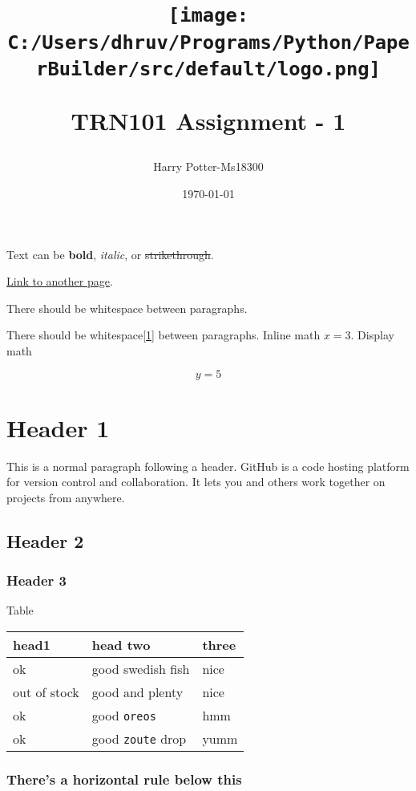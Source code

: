 \documentclass[
  12pt,
]{article}
\title{
  \begin{center}
    \texttt{[image: C:/Users/dhruv/Programs/Python/PaperBuilder/src/default/logo.png]}\\[0.5cm]
  \end{center}
  TRN101 Assignment  - 1 }
\author{Harry Potter-Ms18300
  \date{\today}
}
\begin{document}
\maketitle


      {
        \hypersetup{linkcolor=}
        \setcounter{tocdepth}{3}
    \tableofcontents
  }
    \pagebreak
Text can be \textbf{bold}, \emph{italic}, or \sout{strikethrough}.

\href{https://another-page.html}{Link to another page}.

There should be whitespace between paragraphs.

There should be whitespace\protect\hyperlink{ref-testcite}{{[}1{]}}
between paragraphs. Inline math \(x=3\). Display math

\[y=5\]

\hypertarget{header-1}{%
\section{Header 1}\label{header-1}}

This is a normal paragraph following a header. GitHub is a code hosting
platform for version control and collaboration. It lets you and others
work together on projects from anywhere.

\hypertarget{header-2}{%
\subsection{Header 2}\label{header-2}}

\hypertarget{header-3}{%
\subsubsection{Header 3}\label{header-3}}

Table

\begin{longtable}[]{@{}lll@{}}
\toprule
head1 & head two & three\tabularnewline
\midrule
\endhead
ok & good swedish fish & nice\tabularnewline
out of stock & good and plenty & nice\tabularnewline
ok & good \texttt{oreos} & hmm\tabularnewline
ok & good \texttt{zoute} drop & yumm\tabularnewline
\bottomrule
\end{longtable}

\hypertarget{theres-a-horizontal-rule-below-this}{%
\subsubsection{There's a horizontal rule below
this}\label{theres-a-horizontal-rule-below-this}}
\end{document}
